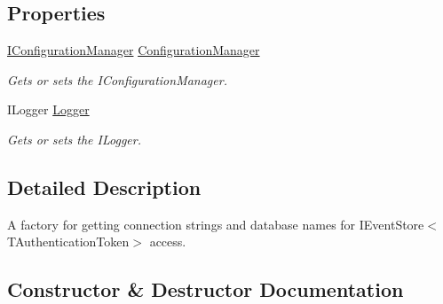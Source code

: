 \subsection*{Properties}
\begin{DoxyCompactItemize}
\item 
\hyperlink{interfaceCqrs_1_1Configuration_1_1IConfigurationManager}{I\+Configuration\+Manager} \hyperlink{classCqrs_1_1MongoDB_1_1Events_1_1MongoDbEventStoreConnectionStringFactory_ae551f6493cce791272dcbfbedf8c18bf_ae551f6493cce791272dcbfbedf8c18bf}{Configuration\+Manager}
\begin{DoxyCompactList}\small\item\em Gets or sets the I\+Configuration\+Manager. \end{DoxyCompactList}\item 
I\+Logger \hyperlink{classCqrs_1_1MongoDB_1_1Events_1_1MongoDbEventStoreConnectionStringFactory_a13fe1d0f10313e37c9eb1788db98cb23_a13fe1d0f10313e37c9eb1788db98cb23}{Logger}
\begin{DoxyCompactList}\small\item\em Gets or sets the I\+Logger. \end{DoxyCompactList}\end{DoxyCompactItemize}


\subsection{Detailed Description}
A factory for getting connection strings and database names for I\+Event\+Store$<$\+T\+Authentication\+Token$>$ access. 



\subsection{Constructor \& Destructor Documentation}
\mbox{\label{classCqrs_1_1MongoDB_1_1Events_1_1MongoDbEventStoreConnectionStringFactory_afb24fa31922f1297f7d7d80c7b14ee14_afb24fa31922f1297f7d7d80c7b14ee14}} 
